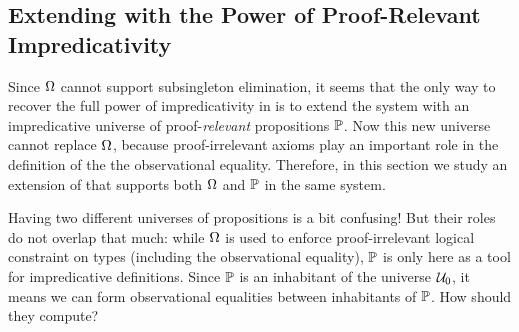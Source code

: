 

\subsection{Extending \SetoidCC with the Power of Proof-Relevant Impredicativity}

Since \( \Omega \) cannot support subsingleton elimination, it seems that the 
only way to recover the full power of impredicativity in \SetoidCC is to extend 
% 
the system with an impredicative universe of proof-\emph{relevant} propositions 
\( \mathbb{P} \). 
% 
Now this new universe cannot replace \( \Omega \), because 
proof-irrelevant axioms play an important role in the definition of the
the observational equality. 
% 
Therefore, in this section we study an extension of \SetoidCC that supports both \( \Omega \) 
and \( \mathbb{P} \) in the same system.
% 

Having two different universes of propositions is a bit confusing! But their
roles do not overlap that much: while \( \Omega \) is used to enforce 
proof-irrelevant logical constraint on types (including the observational 
equality), \( \mathbb{P} \) is only here as a tool for impredicative definitions.
% 
Since \( \mathbb{P} \) is an inhabitant of the universe \( \mathcal{U}_0 \), it means we can form
observational equalities between inhabitants of \( \mathbb{P} \).
% 
How should they compute?

